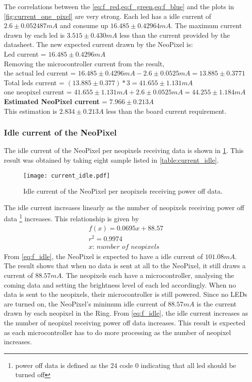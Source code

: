 The correlations between the \cref{eq:f_red,eq:f_green,eq:f_blue} and the plots in \cref{fig:current_one_pixel} are very strong. Each led has a idle current of $2.6 \pm 0.052487 mA$ and consume up $16.485 \pm 0.42964 mA$. The maximum current drawn by each led is $3.515\pm0.430 mA$ less than the current provided by the datasheet. The new expected current drawn by the NeoPixel is:\\

{
	\centering
	Led current = $16.485 \pm 0.4296 mA$ \\
	Removing the microcontroller current from the result,\\ the actual led current = $16.485 \pm 0.4296 mA - 2.6 \pm 0.0525 mA = 13.885 \pm 0.3771$  \\
	Total leds current = $(13.885 \pm 0.377)*3 = 41.655 \pm 1.131 mA$  \\
	one neopixel current = $41.655 \pm 1.131 mA + 2.6 \pm 0.0525 mA  = 44.255 \pm 1.184 mA $\\
	\textbf{Estimated NeoPixel current} = $7.966 \pm 0.213 A$\\
}
This estimation is $2.834\pm0.213A$ less than the board current requirement.

\subsubsection{Idle current of the NeoPixel}\label{idle_current}
The idle current of the NeoPixel per neopixels receiving data is shown in \cref{fig:current_idle}. This result was obtained by taking eight sample listed in \cref{table:current_idle}. 
\begin{figure}[ht]
	\centering
	\texttt{[image: current\_idle.pdf]}
	\caption{Idle current of the NeoPixel per neopixels receiving power off data.}
	\label{fig:current_idle}
\end{figure}
The idle current increases linearly as the number of neopixels receiving power off data \footnote{power off data is defined as the 24 code 0 indicating that all led should be turned off} increases. This relationship is given by 
\begin{equation}
\label{eq:f_idle}
\begin{multlined}
f(x) = 0.0695x+88.57 \\
r^2 = 0.9974\\
\textit{$x$: number of neopixels}
\end{multlined}
\end{equation} 
From \cref{eq:f_idle}, the NeoPixel is expected to have a idle current of $101.08mA$. The result shows that when no data is sent at all to the NeoPixel, it still draws a current of $88.57mA$. The neopixels each have a microcontroller, analysing the coming data and setting the brightness level of each led accordingly. When no data is sent to the neopixels, their microcontroller is still powered. Since no LEDs are turned on, the NeoPixel's minimum idle current of $88.57mA$ is the current drawn by each neopixel in the Ring. From \cref{eq:f_idle}, the idle current increases as the number of neopixel receiving power off data increases. This result is expected as each microcontroller has to do more processing as the number of neopixel increases. 

